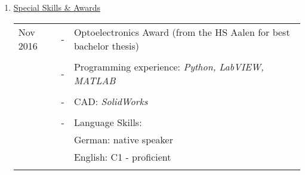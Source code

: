 \documentclass[12pt,a4paper]{scrartcl}
\begin{document}
\begin{enumerate}[label=\Alph*.]
	\pagebreak
	
	\item \underline{Special Skills \& Awards}
	
		\begin{tabulary}{\textwidth}{@{}p{3.8cm}CL}
			Nov 2016 & - & Optoelectronics Award (from the HS Aalen for best bachelor thesis)\\
			\\[-0.5em]
			& - & Programming experience: \textit{Python, LabVIEW, MATLAB}\\
			\\[-0.5em]
			& - & CAD: \textit{SolidWorks}\\
			\\[-0.5em]
		 	& - & Language Skills: \\
			& & German: native speaker\\
			& & English: C1 - proficient \\
			\\[-0.5em]
	
		\end{tabulary}
	
\end{enumerate}
\end{document}
